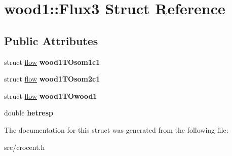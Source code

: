 \hypertarget{structwood1_1_1_flux3}{\section{wood1\-:\-:Flux3 Struct Reference}
\label{structwood1_1_1_flux3}
}
\subsection*{Public Attributes}
\begin{DoxyCompactItemize}
\item 
\hypertarget{structwood1_1_1_flux3_a65e6b30446b63691470b4a579846d64e}{struct \hyperlink{structflow}{flow} {\bfseries wood1\-T\-Osom1c1}}\label{structwood1_1_1_flux3_a65e6b30446b63691470b4a579846d64e}

\item 
\hypertarget{structwood1_1_1_flux3_a48134c5ab7e537b322e81652ded0b5f1}{struct \hyperlink{structflow}{flow} {\bfseries wood1\-T\-Osom2c1}}\label{structwood1_1_1_flux3_a48134c5ab7e537b322e81652ded0b5f1}

\item 
\hypertarget{structwood1_1_1_flux3_a1fc2f015b1b820a5a3f74ee5f2e23a52}{struct \hyperlink{structflow}{flow} {\bfseries wood1\-T\-Owood1}}\label{structwood1_1_1_flux3_a1fc2f015b1b820a5a3f74ee5f2e23a52}

\item 
\hypertarget{structwood1_1_1_flux3_abebea15bfd203e9f95eec233e17bbb98}{double {\bfseries hetresp}}\label{structwood1_1_1_flux3_abebea15bfd203e9f95eec233e17bbb98}

\end{DoxyCompactItemize}


The documentation for this struct was generated from the following file\-:\begin{DoxyCompactItemize}
\item 
src/crocent.\-h\end{DoxyCompactItemize}
